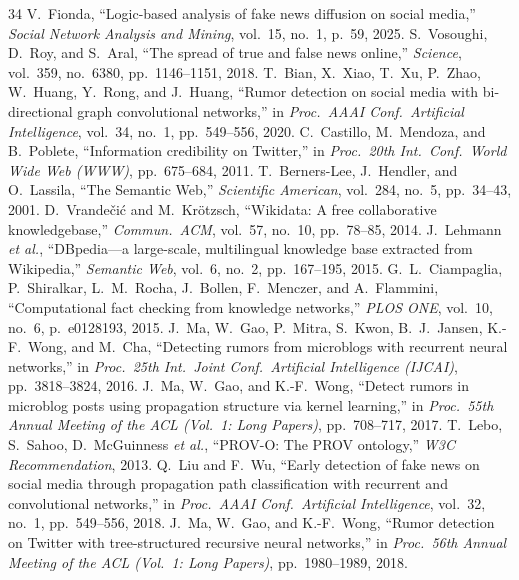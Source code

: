 \documentclass[10pt,twocolumn,a4paper]{article}
\begin{document}
{\footnotesize
\setlength{\itemsep}{0pt}
\begin{thebibliography}{34}
 V.~Fionda, ``Logic-based analysis of fake news diffusion on social media,'' \emph{Social Network Analysis and Mining}, vol.~15, no.~1, p.~59, 2025.
 S.~Vosoughi, D.~Roy, and S.~Aral, ``The spread of true and false news online,'' \emph{Science}, vol.~359, no.~6380, pp.~1146--1151, 2018.
 T.~Bian, X.~Xiao, T.~Xu, P.~Zhao, W.~Huang, Y.~Rong, and J.~Huang, ``Rumor detection on social media with bi-directional graph convolutional networks,'' in \emph{Proc.\ AAAI Conf.\ Artificial Intelligence}, vol.~34, no.~1, pp.~549--556, 2020.
 C.~Castillo, M.~Mendoza, and B.~Poblete, ``Information credibility on Twitter,'' in \emph{Proc.\ 20th Int.\ Conf.\ World Wide Web (WWW)}, pp.~675--684, 2011.
 T.~Berners-Lee, J.~Hendler, and O.~Lassila, ``The Semantic Web,'' \emph{Scientific American}, vol.~284, no.~5, pp.~34--43, 2001.
 D.~Vrande\v{c}i\'{c} and M.~Kr\"{o}tzsch, ``Wikidata: A free collaborative knowledgebase,'' \emph{Commun.\ ACM}, vol.~57, no.~10, pp.~78--85, 2014.
 J.~Lehmann \emph{et al.}, ``DBpedia---a large-scale, multilingual knowledge base extracted from Wikipedia,'' \emph{Semantic Web}, vol.~6, no.~2, pp.~167--195, 2015.
 G.~L.~Ciampaglia, P.~Shiralkar, L.~M.~Rocha, J.~Bollen, F.~Menczer, and A.~Flammini, ``Computational fact checking from knowledge networks,'' \emph{PLOS ONE}, vol.~10, no.~6, p.~e0128193, 2015.
 J.~Ma, W.~Gao, P.~Mitra, S.~Kwon, B.~J.~Jansen, K.-F.~Wong, and M.~Cha, ``Detecting rumors from microblogs with recurrent neural networks,'' in \emph{Proc.\ 25th Int.\ Joint Conf.\ Artificial Intelligence (IJCAI)}, pp.~3818--3824, 2016.
 J.~Ma, W.~Gao, and K.-F.~Wong, ``Detect rumors in microblog posts using propagation structure via kernel learning,'' in \emph{Proc.\ 55th Annual Meeting of the ACL (Vol.~1: Long Papers)}, pp.~708--717, 2017.
 T.~Lebo, S.~Sahoo, D.~McGuinness \emph{et al.}, ``PROV-O: The PROV ontology,'' \emph{W3C Recommendation}, 2013.
 Q.~Liu and F.~Wu, ``Early detection of fake news on social media through propagation path classification with recurrent and convolutional networks,'' in \emph{Proc.\ AAAI Conf.\ Artificial Intelligence}, vol.~32, no.~1, pp.~549--556, 2018.
 J.~Ma, W.~Gao, and K.-F.~Wong, ``Rumor detection on Twitter with tree-structured recursive neural networks,'' in \emph{Proc.\ 56th Annual Meeting of the ACL (Vol.~1: Long Papers)}, pp.~1980--1989, 2018.

\end{thebibliography}}
\end{document}
